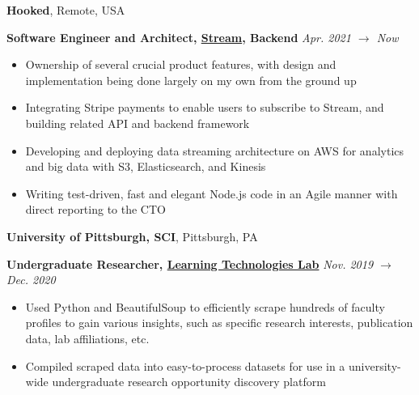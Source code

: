 \documentclass[10pt]{article}
\begin{document}
\begin{flushleft}
		\textbf{Hooked}, Remote, USA\\
		\begin{leftli}
			{\small \textbf{Software Engineer and Architect, \href{https://www.streamorders.com/}{Stream}, Backend}} \hfill \textit{\small Apr. 2021 $\rightarrow$ Now}
			\begin{itemize}
				\item Ownership of several crucial product features, with design and implementation being done largely on my own from the ground up
				\vspace{-2mm}
				\item Integrating Stripe payments to enable users to subscribe to Stream, and building related API and backend framework
				\vspace{-2mm}
				\item Developing and deploying data streaming architecture on AWS for analytics and big data with S3, Elasticsearch, and Kinesis
				\vspace{-2mm}
				\item Writing test-driven, fast and elegant Node.js code in an Agile manner with direct reporting to the CTO
			\end{itemize}
		\end{leftli}

		\vspace{-1.50mm}
		\textbf{University of Pittsburgh, SCI}, Pittsburgh, PA\\
		\begin{leftli}
			{\small \textbf{Undergraduate Researcher, \href{https://www.researchgate.net/publication/346387428_Grapevine_A_profile-based_exploratory_search_and_recommendation_system_for_finding_research_advisors}{Learning Technologies Lab}}} \hfill \textit{\small Nov. 2019 $\rightarrow$ Dec. 2020}
			\begin{itemize}
				\item Used Python and BeautifulSoup to efficiently scrape hundreds of faculty profiles to gain various insights, such as specific research interests, publication data, lab affiliations, etc.
				\vspace{-2mm}
				\item Compiled scraped data into easy-to-process datasets for use in a university-wide undergraduate research opportunity discovery platform
			\end{itemize}
		\end{leftli}


\end{flushleft}
\end{document}
